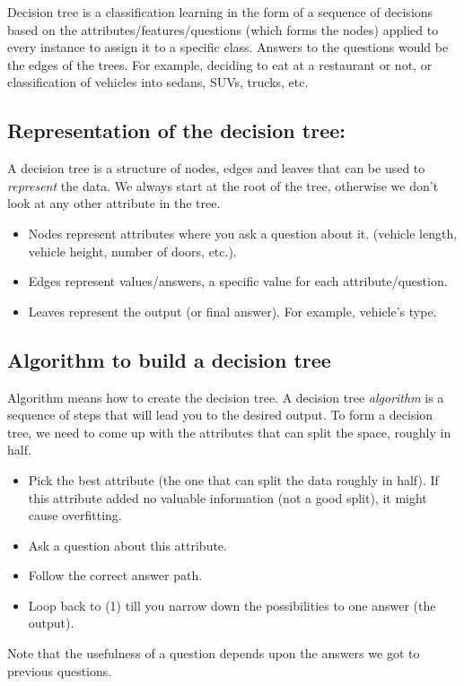 \documentclass[12pt]{report}
\begin{document}
Decision tree is a classification learning in the form of a sequence of decisions based on the attributes/features/questions (which forms the nodes) applied to every instance to assign it to a specific class. Answers to the questions would be the edges of the trees.
For example, deciding to eat at a restaurant or not, or classification of vehicles into sedans, SUVs, trucks, etc.

\subsection{Representation of the decision tree:}

A decision tree is a structure of nodes, edges and leaves that can be used to \textit{represent} the data. We always start at the root of the tree, otherwise we don't look at any other attribute in the tree.
\begin{itemize}
\item Nodes represent attributes where you ask a question about it. (vehicle length, vehicle height, number of doors, etc.).
\item Edges represent values/answers, a specific value for each attribute/question.
\item Leaves represent the output (or final answer). For example, vehicle’s type.
\end{itemize}

\subsection{Algorithm to build a decision tree}
Algorithm means how to create the decision tree. A decision tree \textit{algorithm} is a sequence of steps that will lead you to the desired output. To form a decision tree, we need to come up with the attributes that can split the space, roughly in half.
\begin{itemize}
\item Pick the best attribute (the one that can split the data roughly in half). If this attribute added no valuable information (not a good split), it might cause overfitting.
\item Ask a question about this attribute.
\item Follow the correct answer path.
\item Loop back to (1) till you narrow down the possibilities to one answer (the output).
\end{itemize}
Note that the usefulness of a question depends upon the answers we got to previous questions.
\end{document}
